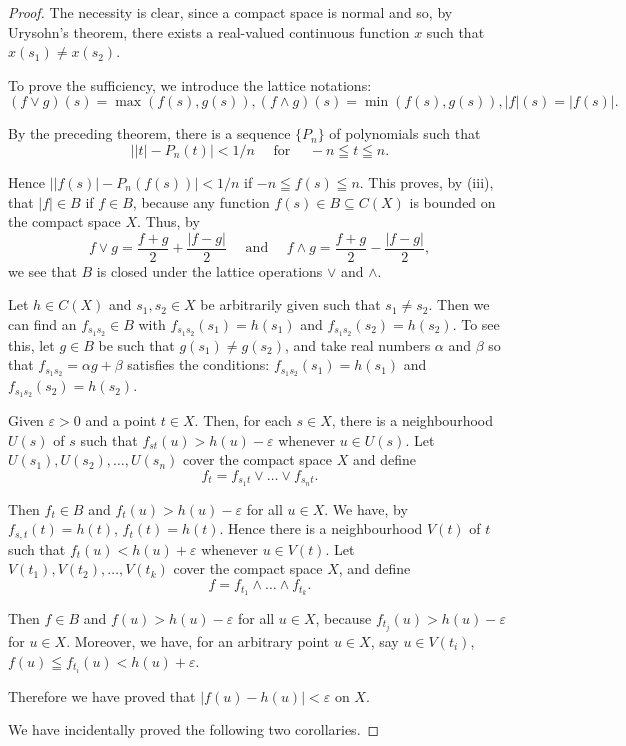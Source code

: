 \begin{proof}
 The necessity is clear, since a compact space is normal and so, by Urysohn's theorem, there exists a real-valued continuous function $x$ such that $x(s_1) \neq x(s_2)$. 

To prove the sufficiency, we introduce the lattice notations: 
\[
(f \vee g) (s) = \max (f (s), g (s)), (f \wedge g) (s) = \min (f (s), g (s)), | f | (s) = | f (s) |.
\]

By the preceding theorem, there is a sequence $\{P_n\}$ of polynomials such that 
\[
\left| \left| t \right|- P _{n} (t) \right| < 1 / n \quad \text{ for } \quad- n \leqq t \leqq n.
\]

Hence $\left|\left|f(s)\right|- P_n(f(s))\right| < 1/n$ if $-n \leqq f(s) \leqq n$. This proves, by (iii), that $|f| \in B$ if $f \in B$, because any function $f(s) \in B \subseteq C(X)$ is bounded on the compact space $X$. Thus, by 
\[
f \vee g = \frac {f + g}{2} + \frac {| f- g |}{2} \quad \text{ and } \quad f \wedge g = \frac {f + g}{2}- \frac {| f- g |}{2},
\]
we see that $B$ is closed under the lattice operations $\vee$ and $\wedge$. 

Let $h \in C(X)$ and $s_1, s_2 \in X$ be arbitrarily given such that $s_1 \neq s_2$. Then we can find an $f_{s_1s_2} \in B$ with $f_{s_1s_2}(s_1) = h(s_1)$ and $f_{s_1s_2}(s_2) = h(s_2)$. To see this, let $g \in B$ be such that $g(s_1) \neq g(s_2)$, and take real numbers $\alpha$ and $\beta$ so that $f_{s_1s_2} = \alpha g + \beta$ satisfies the conditions: $f_{s_1s_2}(s_1) = h(s_1)$ and $f_{s_1s_2}(s_2) = h(s_2)$. 

Given $\varepsilon > 0$ and a point $t \in X$. Then, for each $s \in X$, there is a neighbourhood $U(s)$ of $s$ such that $f_{st}(u) > h(u)- \varepsilon$ whenever $u \in U(s)$. Let $U(s_1), U(s_2), \ldots, U(s_n)$ cover the compact space $X$ and define 
\[
f _{t} = f _ {s _{1} t} \vee \dots \vee f _ {s _{n} t}.
\]

Then $f_{t} \in B$ and $f_{t}(u) > h(u)- \varepsilon$ for all $u \in X$. We have, by $f_{s,t}(t) = h(t)$, $f_{t}(t) = h(t)$. Hence there is a neighbourhood $V(t)$ of $t$ such that $f_{t}(u) < h(u) + \varepsilon$ whenever $u \in V(t)$. Let $V(t_{1}), V(t_{2}), \ldots, V(t_{k})$ cover the compact space $X$, and define 
\[
f = f _ {t _{1}} \wedge \dots \wedge f _ {t _{k}}.
\]

Then $f \in B$ and $f(u) > h(u)- \varepsilon$ for all $u \in X$, because $f_{t_{j}}(u) > h(u)- \varepsilon$ for $u \in X$. Moreover, we have, for an arbitrary point $u \in X$, say $u \in V(t_i)$, $f(u) \leqq f_{t_{i}}(u) < h(u) + \varepsilon$. 

Therefore we have proved that $|f(u)- h(u)| < \varepsilon$ on $X$. 

We have incidentally proved the following two corollaries. 
\end{proof}

